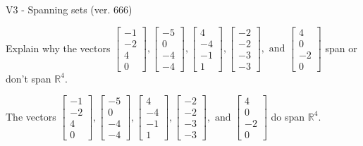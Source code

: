 \begin{exercise}
  \begin{exerciseTitle}V3 - Spanning sets (ver. 666)\end{exerciseTitle}
  \begin{exerciseStatement}
    Explain why the vectors \(\left[\begin{array}{r}
-1 \\
-2 \\
4 \\
0
\end{array}\right] , \left[\begin{array}{r}
-5 \\
0 \\
-4 \\
-4
\end{array}\right] , \left[\begin{array}{r}
4 \\
-4 \\
-1 \\
1
\end{array}\right] , \left[\begin{array}{r}
-2 \\
-2 \\
-3 \\
-3
\end{array}\right] , \text{ and } \left[\begin{array}{r}
4 \\
0 \\
-2 \\
0
\end{array}\right]\) span or don't span \(\mathbb{R}^4\). 
	


  \end{exerciseStatement}
  \begin{exerciseAnswer}
   The vectors \(\left[\begin{array}{r}
-1 \\
-2 \\
4 \\
0
\end{array}\right] , \left[\begin{array}{r}
-5 \\
0 \\
-4 \\
-4
\end{array}\right] , \left[\begin{array}{r}
4 \\
-4 \\
-1 \\
1
\end{array}\right] , \left[\begin{array}{r}
-2 \\
-2 \\
-3 \\
-3
\end{array}\right] , \text{ and } \left[\begin{array}{r}
4 \\
0 \\
-2 \\
0
\end{array}\right]\) 
  	 do  
	span \(\mathbb{R}^4\).
  



\end{exerciseAnswer}
\end{exercise}
